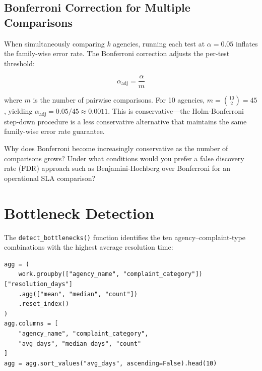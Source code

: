 \subsection{Bonferroni Correction for Multiple Comparisons}

When simultaneously comparing $k$ agencies, running each test at $\alpha = 0.05$ inflates the family-wise error rate. The Bonferroni correction adjusts the per-test threshold:

\begin{equation}
\alpha_{\text{adj}} = \frac{\alpha}{m}
\label{eq:bonferroni}
\end{equation}

where $m$ is the number of pairwise comparisons. For 10 agencies, $m = \binom{10}{2} = 45$, yielding $\alpha_{\text{adj}} = 0.05/45 \approx 0.0011$. This is conservative---the Holm-Bonferroni step-down procedure is a less conservative alternative that maintains the same family-wise error rate guarantee.

\begin{challengebox}
Why does Bonferroni become increasingly conservative as the number of comparisons grows? Under what conditions would you prefer a false discovery rate (FDR) approach such as Benjamini-Hochberg over Bonferroni for an operational SLA comparison?
\end{challengebox}

\section{Bottleneck Detection}
\label{sec:ops-bottleneck}


The \texttt{detect\_bottlenecks()} function identifies the ten agency--complaint-type combinations with the highest average resolution time:

\begin{lstlisting}[style=python, caption={Bottleneck aggregation in \texttt{ops\_engine.py}}, label=lst:bottleneck-agg]
agg = (
    work.groupby(["agency_name", "complaint_category"])["resolution_days"]
    .agg(["mean", "median", "count"])
    .reset_index()
)
agg.columns = [
    "agency_name", "complaint_category",
    "avg_days", "median_days", "count"
]
agg = agg.sort_values("avg_days", ascending=False).head(10)
\end{lstlisting}

